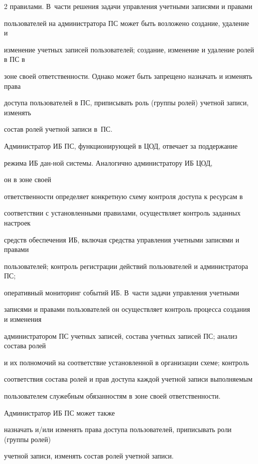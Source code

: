 \begin{multicols}{2}
правилами. В~час\-ти решения задачи управ\-ле\-ния учетными записями и правами 


пользователей на администратора ПС может быть возложено создание, удаление и 


изменение учетных записей пользователей; создание, изменение и удаление ролей в ПС в 


зоне своей ответственности. Однако может быть запрещено назначать и изменять права 


доступа пользователей в ПС, приписывать роль (группы ролей) учетной записи, изменять 


состав ролей учетной записи в~ПС.


       


       Администратор ИБ ПС, функционирующей в ЦОД, отвечает за поддержание 


режима ИБ дан-\linebreak ной сис\-те\-мы. Аналогично администратору ИБ ЦОД,


он в зоне своей 


ответственности определяет конкретную схему контроля доступа к ресурсам в 


соответствии с уста\-нов\-лен\-ны\-ми правилами, осуществляет контроль заданных настроек 


средств обеспечения ИБ, включая средства управления учетными записями и правами 


пользователей; контроль регистрации действий пользователей и администратора ПС; 


оперативный мониторинг событий ИБ. В~час\-ти задачи управ\-ле\-ния учетными 


записями и правами пользователей он осуществляет контроль процесса создания и изменения 


администратором ПС учетных записей, состава учетных записей ПС; анализ состава ролей 


и их полномочий на соответствие уста\-нов\-лен\-ной в организации схеме; контроль 


соответствия состава ролей и прав доступа каждой учетной записи выполняемым 


пользователем служебным обязанностям в зоне своей от\-вет\-ст\-вен\-ности. 


Администратор ИБ ПС может также 


назначать и/или изменять права доступа пользователей, приписывать роли (группы ролей) 


учетной записи, изменять состав ролей учетной за\-писи.



\end{multicols}
